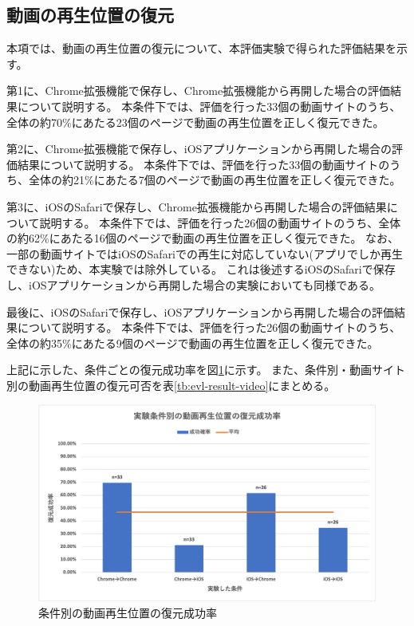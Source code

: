 \subsection{動画の再生位置の復元}
本項では、動画の再生位置の復元について、本評価実験で得られた評価結果を示す。

第1に、Chrome拡張機能で保存し、Chrome拡張機能から再開した場合の評価結果について説明する。
本条件下では、評価を行った33個の動画サイトのうち、全体の約70\%にあたる23個のページで動画の再生位置を正しく復元できた。

第2に、Chrome拡張機能で保存し、iOSアプリケーションから再開した場合の評価結果について説明する。
本条件下では、評価を行った33個の動画サイトのうち、全体の約21\%にあたる7個のページで動画の再生位置を正しく復元できた。

第3に、iOSのSafariで保存し、Chrome拡張機能から再開した場合の評価結果について説明する。
本条件下では、評価を行った26個の動画サイトのうち、全体の約62\%にあたる16個のページで動画の再生位置を正しく復元できた。
なお、一部の動画サイトではiOSのSafariでの再生に対応していない(アプリでしか再生できない)ため、本実験では除外している。
これは後述するiOSのSafariで保存し、iOSアプリケーションから再開した場合の実験においても同様である。

最後に、iOSのSafariで保存し、iOSアプリケーションから再開した場合の評価結果について説明する。
本条件下では、評価を行った26個の動画サイトのうち、全体の約35\%にあたる9個のページで動画の再生位置を正しく復元できた。

上記に示した、条件ごとの復元成功率を図\ref{fig:success-rate-video}に示す。
また、条件別・動画サイト別の動画再生位置の復元可否を表\ref{tb:evl-result-video}にまとめる。

\begin{figure}[htbp]
  \label{fig:success-rate-video}
  \begin{center}
    \includegraphics[bb=0 0 530.6 309.8,width=15cm]{img/060_evaluation/result/video/success-rate-video.pdf}
  \end{center}
  \caption{条件別の動画再生位置の復元成功率}
\end{figure}

